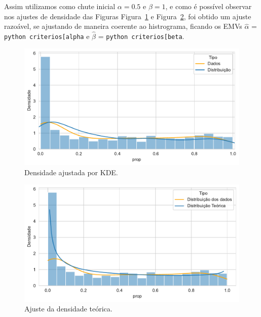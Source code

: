 \documentclass[
]{article}
\begin{document}
Assim utilizamos como chute inicial \(\alpha = 0.5\) e \(\beta = 1\), e
como é possível observar nos ajustes de densidade das Figuras
Figura~\ref{fig-kde} e Figura~\ref{fig-theoric-density}, foi obtido um
ajuste razoável, se ajustando de maneira coerente ao histrograma,
ficando os EMVs \(\widehat{\alpha}\) =
\texttt{python\ criterios{[}\textquotesingle{}alpha\textquotesingle{}{]}}
e \(\widehat{\beta}\) =
\texttt{python\ criterios{[}\textquotesingle{}beta\textquotesingle{}{]}}.

\begin{figure}[H]

{\centering \includegraphics{report_files/figure-pdf/fig-kde-output-1.pdf}

}

\caption{\label{fig-kde}Densidade ajustada por KDE.}

\end{figure}

\begin{figure}[H]

{\centering \includegraphics{report_files/figure-pdf/fig-theoric-density-output-1.pdf}

}

\caption{\label{fig-theoric-density}Ajuste da densidade teórica.}

\end{figure}
\end{document}

